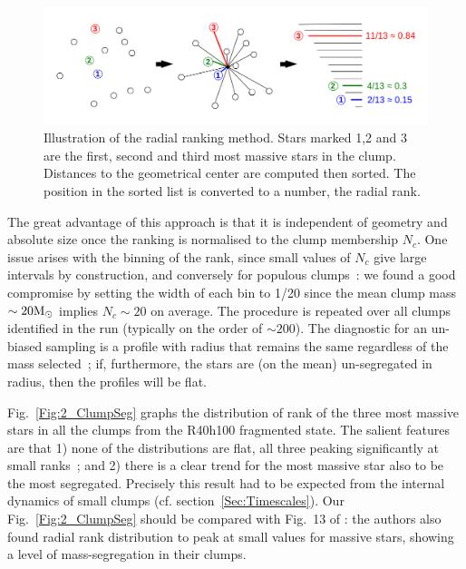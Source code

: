\begin{figure}
\begin{center}
\includegraphics[width=\textwidth]{Figures/2_radial_ranking_schema}
\caption[Illustration of the radial ranking method]{Illustration of the radial ranking method. Stars marked 1,2 and 3 are the first, second and third most massive stars in the clump. Distances to the geometrical center are computed then sorted. The position in the sorted list is converted to a number, the radial rank.}
\label{Fig:2_radial_ranking}
\end{center}
\end{figure}

The great advantage of this approach is that it is independent of geometry and absolute size once the ranking is normalised to the clump membership $N_c$.  One issue arises with the binning of the rank, since small values of $N_c$ give large intervals by construction, and conversely for populous clumps~: we found a good compromise by setting the width of each bin to 1/20 since the mean clump mass $\sim 20 {\textrm{M}_\odot}$ implies $N_c \sim 20$ on average. The procedure is repeated over all clumps identified in the run (typically on the order of $\sim 200$). The diagnostic for an un-biased sampling is a profile with radius that remains the same regardless of the mass selected~; if, furthermore, the stars are (on the mean) un-segregated in radius, then the profiles will be flat. 


Fig.~\ref{Fig:2_ClumpSeg} graphs the  distribution of rank of the three most massive stars in all the clumps from the R40h100 fragmented state. The salient features are that 1) none of the distributions are flat, all three peaking significantly  at small ranks~; and 2) there is a clear trend for the most massive star also to be the most  segregated. Precisely this result had to be expected from the internal dynamics of small clumps (cf. section~\ref{Sec:Timescales}).  Our Fig.~\ref{Fig:2_ClumpSeg} should be compared with Fig.~13 of \cite{Maschberger2010}: the authors also found radial rank distribution to peak at small values for massive stars, showing a level of mass-segregation in their clumps.

